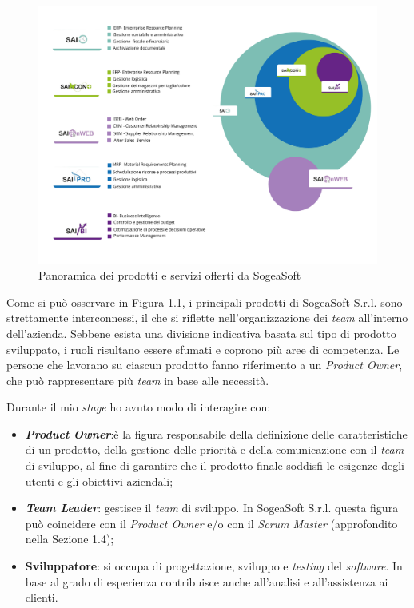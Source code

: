     \begin{figure}
        \centering
        \includegraphics[width=0.9\linewidth]{BCS-Tessi/images/SOGEAProdotti.png}
        \caption{Panoramica dei prodotti e servizi offerti da SogeaSoft}
        \label{fig:panoramica_prodotti}
    \end{figure}

    \noindent Come si può osservare in Figura 1.1, i principali prodotti di SogeaSoft S.r.l. sono strettamente interconnessi, il che si riflette nell’organizzazione dei \textit{team} all’interno dell’azienda. Sebbene esista una divisione indicativa basata sul tipo di prodotto sviluppato, i ruoli risultano essere sfumati e coprono più aree di competenza. 
    \noindent Le persone che lavorano su ciascun prodotto fanno riferimento a un \textit{Product Owner}, che può rappresentare più \textit{team} in base alle necessità.

    \noindent Durante il mio \textit{stage} ho avuto modo di interagire con: 
    \begin{itemize}
        \item \textbf{\textit{Product Owner}}:è la figura responsabile della definizione delle caratteristiche di un prodotto, della gestione delle priorità e della comunicazione con il \textit{team} di sviluppo, al fine di garantire che il prodotto finale soddisfi le esigenze degli utenti e gli obiettivi aziendali;
        
        \item \textbf{\textit{Team Leader}}: gestisce il \textit{team} di sviluppo. In SogeaSoft S.r.l. questa figura può coincidere con il \textit{Product Owner} e/o con il \textit{Scrum Master} (approfondito nella Sezione 1.4);
        \item \textbf{Sviluppatore}: si occupa di progettazione, sviluppo e \textit{testing} del \textit{software}. In base al grado di esperienza contribuisce anche all'analisi e all'assistenza ai clienti. 
    \end{itemize}


